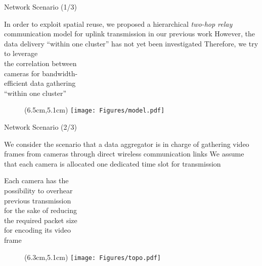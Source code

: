 \begin{frame}{Network Scenario (1/3)}
\begin{itemize}
	\myItem In order to exploit spatial reuse, we proposed a hierarchical \emph{two-hop relay} communication model for uplink transmission in our previous work
	\myItem However, the data delivery ``within one cluster'' has not yet been investigated
	\myItem Therefore, we try to leverage \\
			the correlation between \\
			cameras for bandwidth- \\
			efficient data gathering\\
			``within one cluster''
\end{itemize}
%
\begin{figure}
\centering
\begin{textblock*}{1cm}(6.5cm,5.1cm) %
\texttt{[image: Figures/model.pdf]}
\end{textblock*}
\end{figure}
\end{frame}
\begin{frame}{Network Scenario (2/3)}
\begin{itemize}
	\myItem We consider the scenario that a data aggregator is in charge of gathering video frames from cameras through direct wireless communication links
	\myItem We assume that each camera is allocated one dedicated time slot for transmission
	\begin{itemize}
		\mySubItem Each camera has the \\
				   possibility to overhear \\
				   previous transmission \\
				   for the sake of reducing \\
				   the required packet size \\
				   for encoding its video \\
				   frame
	\end{itemize}
\end{itemize}
%
\begin{figure}
\centering
\begin{textblock*}{1cm}(6.3cm,5.1cm) %
\texttt{[image: Figures/topo.pdf]}
\end{textblock*}
\end{figure}
%
\end{frame}
